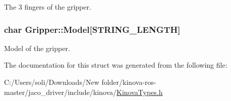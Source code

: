 The 3 fingers of the gripper. 

\subsubsection[{\texorpdfstring{Model}{Model}}]{\setlength{\rightskip}{0pt plus 5cm}char Gripper\+::\+Model\mbox{[}{\bf S\+T\+R\+I\+N\+G\+\_\+\+L\+E\+N\+G\+TH}\mbox{]}}\hypertarget{struct_gripper_aa3b78dc0d3f43e0237049b9c99152cd0}{}\label{struct_gripper_aa3b78dc0d3f43e0237049b9c99152cd0}


Model of the gripper. 



The documentation for this struct was generated from the following file\+:\begin{DoxyCompactItemize}
\item 
C\+:/\+Users/soli/\+Downloads/\+New folder/kinova-\/ros-\/master/jaco\+\_\+driver/include/kinova/\hyperlink{_kinova_types_8h}{Kinova\+Types.\+h}\end{DoxyCompactItemize}
